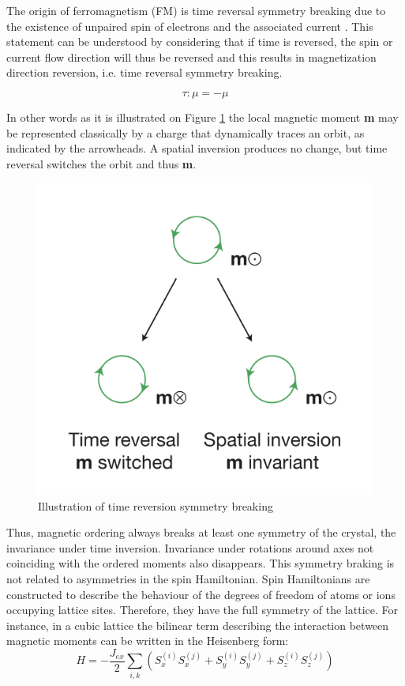 The origin of ferromagnetism (FM) is time reversal symmetry breaking due to the existence of unpaired spin of electrons and the associated current \cite{eerenstein2006multiferroic}. 
This statement
can be understood by considering that if time is reversed, the spin or current
flow direction will thus be reversed and this results in magnetization direction
reversion, i.e. time reversal symmetry breaking.

\begin{equation}
\tau : \mu = - \mu
\end{equation}

In other words as it is illustrated on Figure \ref{fig:time_reverse} the local magnetic moment \textbf{m} may be represented classically by a charge that dynamically traces an orbit, as indicated by the arrowheads. A spatial inversion produces no change, but time reversal switches the orbit and thus \textbf{m}.

\begin{figure}[H]
	\centering
	\includegraphics{fig/review/time_reverse.png}
	\caption[Illustration of time reversion symmetry breaking]{Illustration of time reversion symmetry breaking \cite{eerenstein2006multiferroic}}
\label{fig:time_reverse}
\end{figure}

Thus, magnetic ordering always breaks at least one symmetry of the crystal, the invariance under time inversion. Invariance under rotations around axes not coinciding with the ordered moments also disappears. This symmetry braking is not related to asymmetries in the spin Hamiltonian.
Spin Hamiltonians are constructed to describe the behaviour of the degrees of freedom of atoms or ions occupying lattice sites.
Therefore, they have the full symmetry of the lattice.
For instance, in a cubic lattice the bilinear term describing the interaction between magnetic moments can be written in the Heisenberg form:
\begin{equation}
H = -\frac{J_{ex}}{2}\sum \limits_{i, k} \left( S^{(i)}_x S^{(j)}_x + S^{(i)}_y S^{(j)}_y + S^{(i)}_z S^{(j)}_z \right)
\end{equation}

